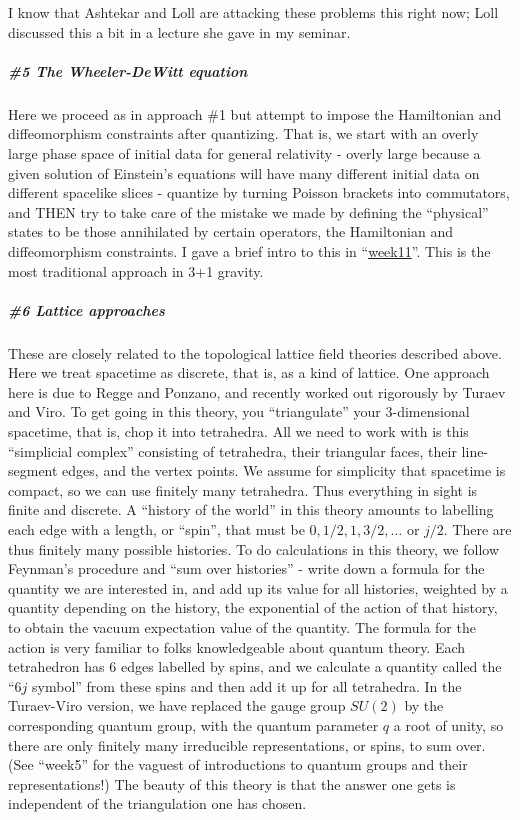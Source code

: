 \documentclass{article}
\begin{document}
I know that Ashtekar and Loll are attacking these problems this right
now; Loll discussed this a bit in a lecture she gave in my seminar.

\hypertarget{the-wheeler-dewitt-equation}{%
\subparagraph{\#5 The Wheeler-DeWitt
equation}\label{the-wheeler-dewitt-equation}}

Here we proceed as in approach \#1 but attempt to impose the Hamiltonian
and diffeomorphism constraints after quantizing. That is, we start with
an overly large phase space of initial data for general relativity -
overly large because a given solution of Einstein's equations will have
many different initial data on different spacelike slices - quantize by
turning Poisson brackets into commutators, and THEN try to take care of
the mistake we made by defining the ``physical'' states to be those
annihilated by certain operators, the Hamiltonian and diffeomorphism
constraints. I gave a brief intro to this in
``\href{week11.html}{week11}''. This is the most traditional approach in
3+1 gravity.

\hypertarget{lattice-approaches}{%
\subparagraph{\#6 Lattice approaches}\label{lattice-approaches}}

These are closely related to the topological lattice field theories
described above. Here we treat spacetime as discrete, that is, as a kind
of lattice. One approach here is due to Regge and Ponzano, and recently
worked out rigorously by Turaev and Viro. To get going in this theory,
you ``triangulate'' your 3-dimensional spacetime, that is, chop it into
tetrahedra. All we need to work with is this ``simplicial complex''
consisting of tetrahedra, their triangular faces, their line-segment
edges, and the vertex points. We assume for simplicity that spacetime is
compact, so we can use finitely many tetrahedra. Thus everything in
sight is finite and discrete. A ``history of the world'' in this theory
amounts to labelling each edge with a length, or ``spin'', that must be
\(0,1/2,1,3/2,\ldots\) or \(j/2\). There are thus finitely many possible
histories. To do calculations in this theory, we follow Feynman's
procedure and ``sum over histories'' - write down a formula for the
quantity we are interested in, and add up its value for all histories,
weighted by a quantity depending on the history, the exponential of the
action of that history, to obtain the vacuum expectation value of the
quantity. The formula for the action is very familiar to folks
knowledgeable about quantum theory. Each tetrahedron has 6 edges
labelled by spins, and we calculate a quantity called the ``\(6j\)
symbol'' from these spins and then add it up for all tetrahedra. In the
Turaev-Viro version, we have replaced the gauge group \(SU(2)\) by the
corresponding quantum group, with the quantum parameter \(q\) a root of
unity, so there are only finitely many irreducible representations, or
spins, to sum over. (See ``week5'' for the vaguest of introductions to
quantum groups and their representations!) The beauty of this theory is
that the answer one gets is independent of the triangulation one has
chosen.
\end{document}
